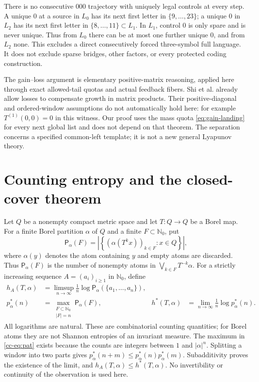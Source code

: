 \documentclass[11pt,reqno]{amsart}
\numberwithin{equation}{section}
\theoremstyle{definition}
\newcommand{\Nzero}{\mathbb N_0}
\newcommand{\Patt}{\mathsf P}
\newcommand{\hpat}{h^{*}}
\begin{document}
There is no consecutive $000$ trajectory with uniquely legal
controls at every step. A unique $0$ at a source in $L_0$ has its
next first letter in $\{9,\ldots,23\}$; a unique $0$ in $L_2$
has its next first letter in $\{8,\ldots,11\}\subset L_1$.
In $L_1$, control $0$ is only spare and is never unique.
Thus from $L_0$ there can be at most one further unique $0$,
and from $L_2$ none. This excludes a direct consecutively forced
three-symbol full language. It does not exclude sparse bridges,
other factors, or every protected coding construction.

The gain--loss argument is elementary positive-matrix reasoning,
applied here through exact allowed-tail quotas and actual feedback
fibers. Shi et al. \cite[Definition~2.5 and Theorems~2.6, 2.8,
pp.~8--11 of arXiv:2004.01867v2]{Shi2021}
already allow losses to compensate growth in matrix products.
Their positive-diagonal and ordered-window assumptions do not
automatically hold here: for example $T^{(1)}(0,0)=0$ in this
witness. Our proof uses the mass quota
\eqref{eq:gain-landing} for every next global list and does not
depend on that theorem. The separation concerns a specified
common-left template; it is not a new general Lyapunov theory.


\section{Counting entropy and the closed-cover theorem}

Let $Q$ be a nonempty compact metric space and let $T:Q\to Q$ be a Borel
map. For a finite Borel partition $\alpha$ of $Q$ and a finite
$F\subset\Nzero$, put
\[
 \Patt_\alpha(F)=
 \left|\left\{(\alpha(T^k x))_{k\in F}:x\in Q\right\}\right|,
\]
where $\alpha(y)$ denotes the atom containing $y$ and empty atoms are
discarded. Thus $\Patt_\alpha(F)$ is the number of nonempty atoms in
$\bigvee_{k\in F}T^{-k}\alpha$. For a strictly increasing sequence
$A=(a_i)_{i\ge1}$ in $\Nzero$, define
\begin{align}
 h_A(T,\alpha)&=\limsup_{n\to\infty}\frac1n
       \log\Patt_\alpha(\{a_1,\ldots,a_n\}),\label{cc-eq:seq}\\
 p_\alpha^*(n)&=\max_{\substack{F\subset\Nzero\\ |F|=n}}
                    \Patt_\alpha(F),
 &\hpat(T,\alpha)&=\lim_{n\to\infty}\frac1n\log p_\alpha^*(n).
 \label{cc-eq:pat}
\end{align}
All logarithms are natural. These are combinatorial counting quantities;
for Borel atoms they are not Shannon entropies of an invariant measure.
The maximum in \eqref{cc-eq:pat} exists because the counts are integers
between $1$ and $|\alpha|^n$. Splitting a window into two parts gives
$p_\alpha^*(n+m)\le p_\alpha^*(n)p_\alpha^*(m)$. Subadditivity proves the
existence of the limit, and $h_A(T,\alpha)\le\hpat(T,\alpha)$.
No invertibility or continuity of the observation is used here.
\end{document}
